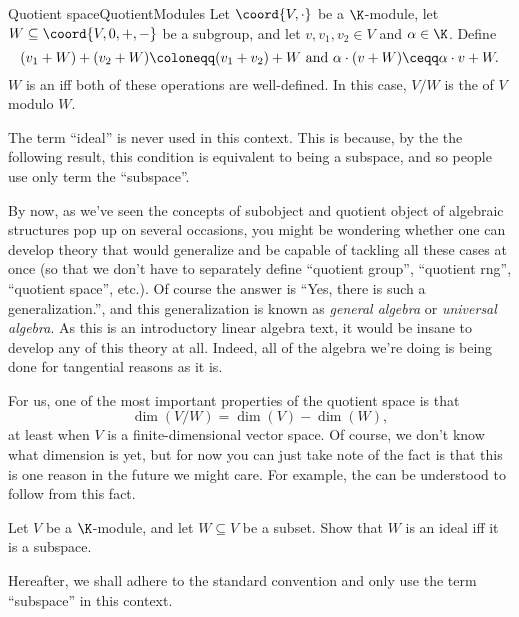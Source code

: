 \begin{dfn}{Quotient space}{QuotientModules}
	Let $\coord{V,\cdot}$ be a $\K$-module, let $W\subseteq \coord{V,0,+,-}$ be a subgroup, and let $v,v_1,v_2\in V$ and $\alpha \in \K$.  Define
	\begin{equation}
	(v_1+W)+(v_2+W)\coloneqq (v_1+v_2)+W\text{ and }\alpha \cdot (v+W)\ceqq \alpha \cdot v+W.
	\end{equation}
	$W$ is an  iff both of these operations are well-defined.  In this case, $V/W$ is the  of $V$ modulo $W$.
	\begin{rmk}
		The term ``ideal'' is never used in this context.  This is because, by the the following result, this condition is equivalent to being a subspace, and so people use only term the ``subspace''.
	\end{rmk}
	\begin{rmk}
		By now, as we've seen the concepts of subobject and quotient object of algebraic structures pop up on several occasions, you might be wondering whether one can develop theory that would generalize and be capable of tackling all these cases at once (so that we don't have to separately define ``quotient group'', ``quotient rng'', ``quotient space'', etc.).  Of course the answer is ``Yes, there is such a generalization.'', and this generalization is known as \emph{general algebra} or \emph{universal algebra}.  As this is an introductory linear algebra text, it would be insane to develop any of this theory at all.  Indeed, all of the algebra we're doing is being done for tangential reasons as it is.
	\end{rmk}
	\begin{rmk}
		For us, one of the most important properties of the quotient space is that
		\begin{equation}
			\dim (V/W)=\dim (V)-\dim (W),
		\end{equation}
		at least when $V$ is a finite-dimensional vector space.  Of course, we don't know what dimension is yet, but for now you can just take note of the fact is that this is one reason in the future we might care.  For example, the  can be understood to follow from this fact.
	\end{rmk}
\end{dfn}
\begin{exr}{}{}
	Let $V$ be a $\K$-module, and let $W\subseteq V$ be a subset.  Show that $W$ is an ideal iff it is a subspace.
	\begin{rmk}
		Hereafter, we shall adhere to the standard convention and only use the term ``subspace'' in this context.
	\end{rmk}
\end{exr}

